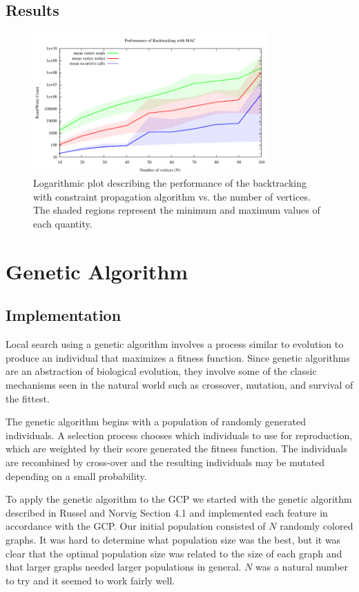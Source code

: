 \documentclass{article}
\begin{document}
	\subsection{Results}
	
		\begin{figure}[h!]
			\centering
			\includegraphics[width=0.8\textwidth]{../results_4/backtracking_mac/bt_mac_performance}
			\caption{Logarithmic plot describing the performance of the backtracking with constraint propagation algorithm vs. the number of vertices. The shaded regions represent the minimum and maximum values of each quantity.}
		\end{figure}
	
\section{Genetic Algorithm}

	\subsection{Implementation}
	Local search using a genetic algorithm involves a process similar to evolution to produce an individual that maximizes a fitness function. Since genetic algorithms are an abstraction of biological evolution, they involve some of the classic mechanisms seen in the natural world such as crossover, mutation, and survival of the fittest\cite{genetic}.
	
	The genetic algorithm begins with a population of randomly generated individuals. A selection process chooses which individuals to use for reproduction, which are weighted by their score generated the fitness function. The individuals are recombined by cross-over and the resulting individuals may be mutated depending on a small probability.
	
	To apply the genetic algorithm to the GCP we started with the genetic algorithm described in Russel and Norvig Section 4.1\cite{ai} and implemented each feature in accordance with the GCP. Our initial population consisted of $N$ randomly colored graphs. It was hard to determine what population size was the best, but it was clear that the optimal population size was related to the size of each graph and that larger graphs needed larger populations in general. $N$ was a natural number to try and it seemed to work fairly well.
	
\end{document}
